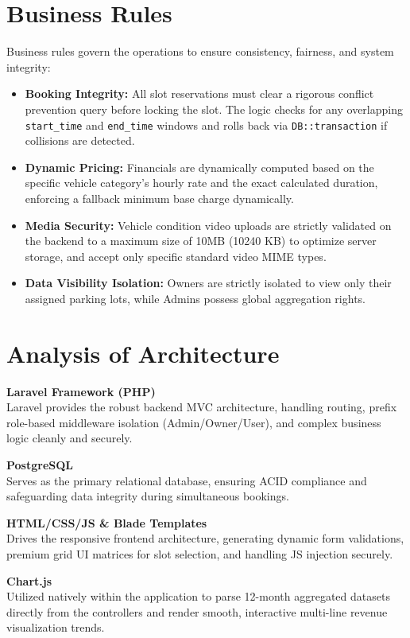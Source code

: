 \documentclass[12pt,a4paper]{report}
\begin{document}
\section{Business Rules}
Business rules govern the operations to ensure consistency, fairness, and system integrity:
\begin{itemize}
    \item \textbf{Booking Integrity:} All slot reservations must clear a rigorous conflict prevention query before locking the slot. The logic checks for any overlapping \texttt{start\_time} and \texttt{end\_time} windows and rolls back via \texttt{DB::transaction} if collisions are detected.
    \item \textbf{Dynamic Pricing:} Financials are dynamically computed based on the specific vehicle category's hourly rate and the exact calculated duration, enforcing a fallback minimum base charge dynamically.
    \item \textbf{Media Security:} Vehicle condition video uploads are strictly validated on the backend to a maximum size of 10MB (10240 KB) to optimize server storage, and accept only specific standard video MIME types.
    \item \textbf{Data Visibility Isolation:} Owners are strictly isolated to view only their assigned parking lots, while Admins possess global aggregation rights.
\end{itemize}

\section{Analysis of Architecture}
\textbf{Laravel Framework (PHP)}\\
Laravel provides the robust backend MVC architecture, handling routing, prefix role-based middleware isolation (Admin/Owner/User), and complex business logic cleanly and securely.

\textbf{PostgreSQL}\\
Serves as the primary relational database, ensuring ACID compliance and safeguarding data integrity during simultaneous bookings.

\textbf{HTML/CSS/JS \& Blade Templates}\\
Drives the responsive frontend architecture, generating dynamic form validations, premium grid UI matrices for slot selection, and handling JS injection securely.

\textbf{Chart.js}\\
Utilized natively within the application to parse 12-month aggregated datasets directly from the controllers and render smooth, interactive multi-line revenue visualization trends.
\end{document}
